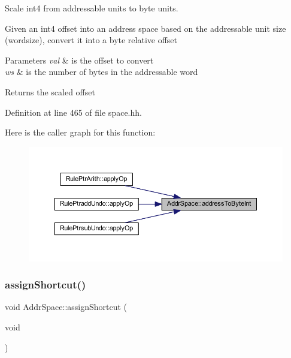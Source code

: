 Scale int4 from addressable units to byte units. 

Given an int4 offset into an address space based on the addressable unit size (wordsize), convert it into a byte relative offset 
\begin{DoxyParams}{Parameters}
{\em val} & is the offset to convert \\
\hline
{\em ws} & is the number of bytes in the addressable word \\
\hline
\end{DoxyParams}
\begin{DoxyReturn}{Returns}
the scaled offset 
\end{DoxyReturn}


Definition at line 465 of file space.\+hh.

Here is the caller graph for this function\+:
\nopagebreak
\begin{figure}[H]
\begin{center}
\leavevmode
\includegraphics[width=350pt]{class_addr_space_a18aa860242e1e753b3ad786a0aa1b36e_icgraph}
\end{center}
\end{figure}
\mbox{\label{class_addr_space_a7ffd0df8a2d71013ec0a9b572bd549d9}} 
\subsubsection{\texorpdfstring{assignShortcut()}{assignShortcut()}}
{\footnotesize\ttfamily void Addr\+Space\+::assign\+Shortcut (\begin{DoxyParamCaption}\item[{void}]{ }\end{DoxyParamCaption})\hspace{0.3cm}{\ttfamily [protected]}}



